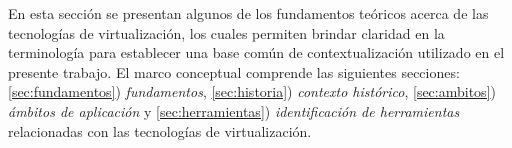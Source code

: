 En esta sección se presentan algunos de los fundamentos teóricos acerca de las tecnologías de virtualización, los cuales permiten brindar claridad en la terminología para establecer una base común de contextualización utilizado en el presente trabajo.  El marco conceptual comprende las siguientes secciones:  \ref{sec:fundamentos}) \textit{fundamentos}, \ref{sec:historia}) \textit{contexto histórico}, \ref{sec:ambitos}) \textit{ámbitos de aplicación} y \ref{sec:herramientas}) \textit{identificación de herramientas} relacionadas con las tecnologías de virtualización.

\newpage


\newpage



\newpage



\newpage



